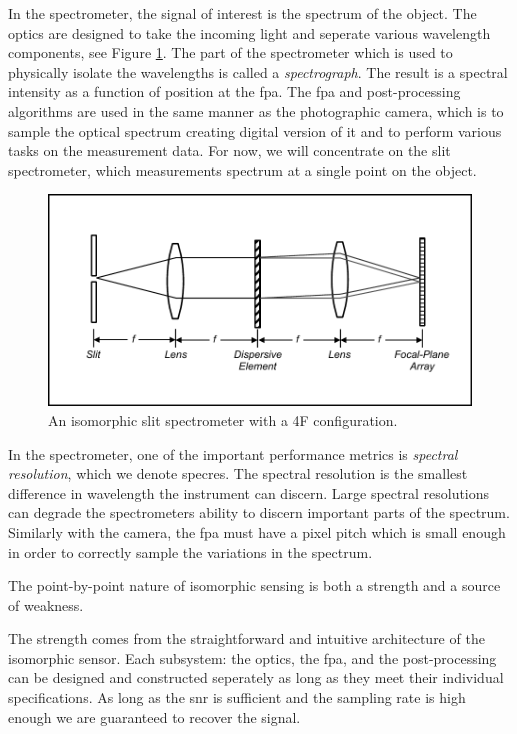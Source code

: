 In the spectrometer, the signal of interest is the spectrum of the object. The optics are designed to take the incoming light and seperate various wavelength components, see Figure \ref{fig:slitspectrometer}. The part of the spectrometer which is used to physically isolate the wavelengths is called a \emph{spectrograph}. The result is a spectral intensity as a function of position at the \gls{fpa}. The \gls{fpa} and post-processing algorithms are used in the same manner as the photographic camera, which is to sample the optical spectrum creating digital version of it and to perform various tasks on the measurement data. For now, we will concentrate on the slit spectrometer, which measurements spectrum at a single point on the object.


\begin{figure}
    \centering
    \includegraphics[scale=1]{slitspectrometer}
    \caption{An isomorphic slit spectrometer with a 4F configuration.}
    \label{fig:slitspectrometer}
\end{figure}

In the spectrometer, one of the important performance metrics is \emph{spectral resolution}, which we denote \gls{specres}. The spectral resolution is the smallest difference in wavelength the instrument can discern. Large spectral resolutions can degrade the spectrometers ability to discern important parts of the spectrum. Similarly with the camera, the \gls{fpa} must have a pixel pitch which is small enough in order to correctly sample the variations in the spectrum. 

The point-by-point nature of isomorphic sensing is both a strength and a source of weakness. 

The strength comes from the straightforward and intuitive architecture of the isomorphic sensor. Each subsystem: the optics, the \acrfull{fpa}, and the post-processing can be designed and constructed seperately as long as they meet their individual specifications. As long as the \gls{snr} is sufficient and the sampling rate is high enough we are guaranteed to recover the signal.

